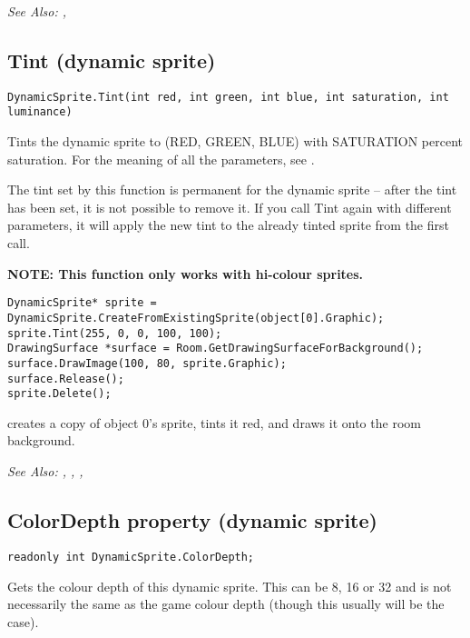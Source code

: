 \it{See Also:} ,


\subsection{Tint (dynamic sprite)}\label{DynamicSprite.Tint}%

\begin{verbatim}
DynamicSprite.Tint(int red, int green, int blue, int saturation, int luminance)
\end{verbatim}
Tints the dynamic sprite to (RED, GREEN, BLUE) with SATURATION percent
saturation. For the meaning of all the parameters, see .

The tint set by this function is permanent for the dynamic sprite -- after the tint
has been set, it is not possible to remove it. If you call Tint again with different
parameters, it will apply the new tint to the already tinted sprite from the first call.

\bf{NOTE:} This function only works with hi-colour sprites.

\begin{verbatim}
DynamicSprite* sprite = DynamicSprite.CreateFromExistingSprite(object[0].Graphic);
sprite.Tint(255, 0, 0, 100, 100);
DrawingSurface *surface = Room.GetDrawingSurfaceForBackground();
surface.DrawImage(100, 80, sprite.Graphic);
surface.Release();
sprite.Delete();
\end{verbatim}
creates a copy of object 0's sprite, tints it red, and draws it onto the room background.

\it{See Also:} ,
,
,


\subsection{ColorDepth property (dynamic sprite)}\label{DynamicSprite.ColorDepth}%

\begin{verbatim}
readonly int DynamicSprite.ColorDepth;
\end{verbatim}
Gets the colour depth of this dynamic sprite. This can be 8, 16 or 32 and is not necessarily the same
as the game colour depth (though this usually will be the case).


